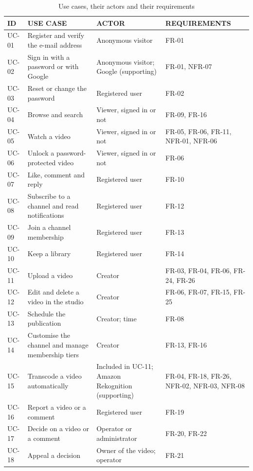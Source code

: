 \begin{table}[htbp]
\centering
\caption{Use cases, their actors and their requirements}
\label{tab:uc-summary}
\footnotesize
\begin{tabularx}{\textwidth}{>{\raggedright\arraybackslash}p{} >{\raggedright\arraybackslash}X >{\raggedright\arraybackslash}p{} >{\raggedright\arraybackslash}p{}}
\toprule
\textbf{ID} & \textbf{USE CASE} & \textbf{ACTOR} & \textbf{REQUIREMENTS} \\
\midrule
UC-01 & Register and verify the e-mail address & Anonymous visitor & FR-01 \\
UC-02 & Sign in with a password or with Google & Anonymous visitor; Google (supporting) & FR-01, NFR-07 \\
UC-03 & Reset or change the password & Registered user & FR-02 \\
UC-04 & Browse and search & Viewer, signed in or not & FR-09, FR-16 \\
UC-05 & Watch a video & Viewer, signed in or not & FR-05, FR-06, FR-11, NFR-01, NFR-06 \\
UC-06 & Unlock a password-protected video & Viewer, signed in or not & FR-06 \\
UC-07 & Like, comment and reply & Registered user & FR-10 \\
UC-08 & Subscribe to a channel and read notifications & Registered user & FR-12 \\
UC-09 & Join a channel membership & Registered user & FR-13 \\
UC-10 & Keep a library & Registered user & FR-14 \\
UC-11 & Upload a video & Creator & FR-03, FR-04, FR-06, FR-24, FR-26 \\
UC-12 & Edit and delete a video in the studio & Creator & FR-06, FR-07, FR-15, FR-25 \\
UC-13 & Schedule the publication & Creator; time & FR-08 \\
UC-14 & Customise the channel and manage membership tiers & Creator & FR-13, FR-16 \\
UC-15 & Transcode a video automatically & Included in UC-11; Amazon Rekognition (supporting) & FR-04, FR-18, FR-26, NFR-02, NFR-03, NFR-08 \\
UC-16 & Report a video or a comment & Registered user & FR-19 \\
UC-17 & Decide on a video or a comment & Operator or administrator & FR-20, FR-22 \\
UC-18 & Appeal a decision & Owner of the video; operator & FR-21 \\

\end{tabularx}
\end{table}
